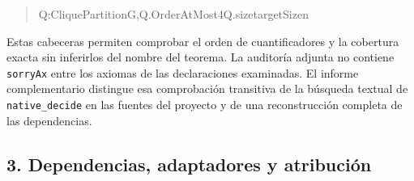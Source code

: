 \documentclass[spanish,11pt,a4paper]{article}
\newlength{\LeanCharWidth}
\begin{document}
\begin{quote}
\noindent \hspace*{\dimexpr 8\LeanCharWidth\relax}{\LeanSymbols ∃}\hspace*{\dimexpr 1\LeanCharWidth\relax}Q\hspace*{\dimexpr 1\LeanCharWidth\relax}:\hspace*{\dimexpr 1\LeanCharWidth\relax}CliquePartition\hspace*{\dimexpr 1\LeanCharWidth\relax}G,\hspace*{\dimexpr 1\LeanCharWidth\relax}Q.OrderAtMost\hspace*{\dimexpr 1\LeanCharWidth\relax}4\hspace*{\dimexpr 1\LeanCharWidth\relax}{\LeanSymbols ∧}\hspace*{\dimexpr 1\LeanCharWidth\relax}Q.size\hspace*{\dimexpr 1\LeanCharWidth\relax}{\LeanSymbols ≤}\hspace*{\dimexpr 1\LeanCharWidth\relax}targetSize\hspace*{\dimexpr 1\LeanCharWidth\relax}n\par
\end{quote}

Estas cabeceras permiten comprobar el orden de cuantificadores y la
cobertura exacta sin inferirlos del nombre del teorema. La auditoría
adjunta no contiene \nolinkurl{sorryAx} entre los axiomas de las
declaraciones examinadas. El informe complementario distingue esa
comprobación transitiva de la búsqueda textual de
\nolinkurl{native_decide} en las fuentes del proyecto y de una
reconstrucción completa de las dependencias.

\subsection{3. Dependencias, adaptadores y
atribución}\label{dependencias-adaptadores-y-atribuciuxf3n}
\end{document}
